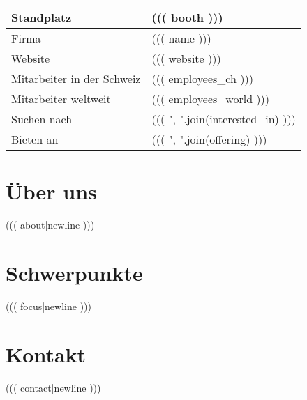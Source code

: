 \documentclass[a4paper]{article}
\author{Alexander Dietmüller}
\begin{document}
\begin{tabular}{l l}
Standplatz & ((( booth )))\\
\hline
Firma & ((( name ))) \\
Website & ((( website )))\\
Mitarbeiter in der Schweiz & ((( employees_ch )))\\
Mitarbeiter weltweit &((( employees_world )))\\
\hline
Suchen nach & ((( ", ".join(interested_in) )))\\
Bieten an & ((( ", ".join(offering) )))\\
\end{tabular}

\section*{Über uns}
((( about|newline )))

\section*{Schwerpunkte}
((( focus|newline )))

\section*{Kontakt}
((( contact|newline )))
\end{document}

